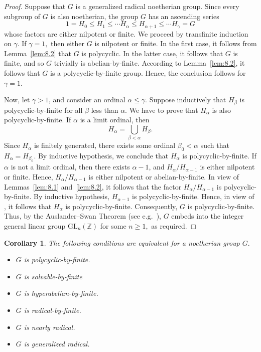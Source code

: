 \documentclass{amsart}
\newtheorem{corollary}[theorem]{Corollary}
\theoremstyle{definition}
\begin{document}
\begin{proof} Suppose that $G$ is a generalized radical noetherian group. Since every subgroup of $G$ is also noetherian, the group $G$ has an ascending series
	$$1=H_0\le H_1\le\cdots H_\alpha\le H_{\alpha+1}\le\cdots H_\gamma=G$$
	whose factors are either nilpotent or finite.
	We proceed by transfinite induction on $\gamma.$ If $\gamma=1,$ then either $G$ is nilpotent or finite. In the first case, it follows from Lemma~\ref{lem:8.2} that $G$ is polycyclic. In the latter case, it follows that $G$ is finite, and so $G$ trivially is abelian-by-finite. According to Lemma~\ref{lem:8.2}, it follows that $G$ is a polycyclic-by-finite group. Hence, the conclusion follows for $\gamma=1$.
	
	Now, let $\gamma>1$, and consider an ordinal $\alpha\le \gamma$. Suppose inductively that $H_\beta$ is polycyclic-by-finite for all $\beta$ less than $\alpha$. We have to prove that $H_\alpha$ is also polycyclic-by-finite. If $\alpha$ is a limit ordinal, then 
	$$H_\alpha=\bigcup_{\beta<\alpha} H_\beta.$$
	Since $H_\alpha$ is finitely generated, there exists some ordinal $\beta_0<\alpha$ such that $H_\alpha=H_{\beta_0}$. By inductive hypothesis, we conclude that $H_\alpha$ is polycyclic-by-finite. If $\alpha$ is not a limit ordinal, then there exists $\alpha-1$, and $H_\alpha/H_{\alpha-1}$ is either nilpotent or finite. Hence, $H_\alpha/H_{\alpha-1}$ is either nilpotent or abelian-by-finite. In view of Lemmas~\ref{lem:8.1} and~\ref{lem:8.2}, it follows that the factor $H_\alpha/H_{\alpha-1}$ is polycyclic-by-finite. By inductive hypothesis, $H_{\alpha-1}$ is polycyclic-by-finite. Hence, in view of \cite[Proposition 5.7]{Bo_SilberBAdd_2021}, it follows that $H_\alpha$ is polycyclic-by-finite. Consequently, $G$ is polycyclic-by-finite. Thus, by the Auslander–Swan Theorem (see e.g.~\cite[Theorem 5.22]{Bo_SilberBAdd_2021}), $G$ embeds into the integer general linear group $\mathrm{GL}_n(\mathbb{Z})$ for some $n\geq 1,$ as required.
\end{proof}
\begin{corollary}\label{cor:8.4} The following conditions are equivalent for a noetherian group $G.$ 
	\begin{itemize}
		\rm\item [(1)]\textit{$G$ is polycyclic-by-finite.}
		\item [(2)]\textit{$G$ is solvable-by-finite}
		\item [(3)]\textit{$G$ is hyperabelian-by-finite.}
		\item [(4)]\textit{$G$ is radical-by-finite.}
		\item [(5)]\textit{$G$ is nearly radical.}
		\item [(6)]\textit{$G$ is generalized radical.}
	\end{itemize}
\end{corollary}
\end{document}
